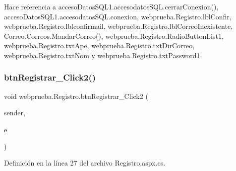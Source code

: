 \begin{DoxyCode}{0}

\end{DoxyCode}


Hace referencia a acceso\+Datos\+S\+Q\+L1.\+accesodatos\+S\+Q\+L.\+cerrar\+Conexion(), acceso\+Datos\+S\+Q\+L1.\+accesodatos\+S\+Q\+L.\+conexion, webprueba.\+Registro.\+lbl\+Confir, webprueba.\+Registro.\+lblconfirmail, webprueba.\+Registro.\+lbl\+Correo\+Inexistente, Correo.\+Correos.\+Mandar\+Correo(), webprueba.\+Registro.\+Radio\+Button\+List1, webprueba.\+Registro.\+txt\+Ape, webprueba.\+Registro.\+txt\+Dir\+Correo, webprueba.\+Registro.\+txt\+Nom y webprueba.\+Registro.\+txt\+Password1.

\mbox{\label{classwebprueba_1_1_registro_a142c34865f9d885c718e351a53c9372b}} 
\subsubsection{\texorpdfstring{btnRegistrar\_Click2()}{btnRegistrar\_Click2()}\hspace{0.1cm}{\footnotesize\ttfamily [2/2]}}
{\footnotesize\ttfamily void webprueba.\+Registro.\+btn\+Registrar\+\_\+\+Click2 (\begin{DoxyParamCaption}\item[{object}]{sender,  }\item[{Event\+Args}]{e }\end{DoxyParamCaption})\hspace{0.3cm}{\ttfamily [protected]}}



Definición en la línea 27 del archivo Registro.\+aspx.\+cs.


